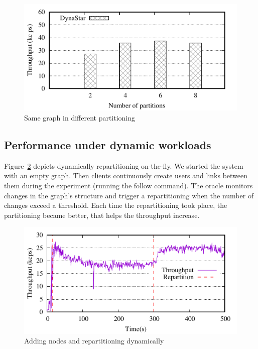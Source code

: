 \begin{figure}[ht]
	\includegraphics{figures/experiments/throughput-avg-vary-partition}
	\caption{Same graph in different partitioning}
	\label{fig:4p1p_varying_partition_size}
\end{figure}


\subsection{Performance under dynamic workloads}

Figure~\ref{fig:dynamic_load_tput} depicts dynamically repartitioning
on-the-fly.  We started the system with an empty graph. Then clients
continuously create users and links between them during the experiment
(running the follow command).  The oracle monitors changes in the
graph's structure and trigger a repartitioning when the number of
changes exceed a threshold.  Each time the repartitioning took place,
the partitioning became better, that helps the throughput increase.

\begin{figure}[ht]
	\includegraphics{figures/experiments/dynamicload-tp-move-4p}
	\caption{Adding nodes and repartitioning dynamically}
	\label{fig:dynamic_load_tput}
\end{figure}

